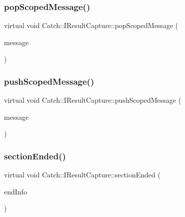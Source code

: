\subsubsection{\texorpdfstring{pop\+Scoped\+Message()}{popScopedMessage()}}
{\footnotesize\ttfamily virtual void Catch\+::\+I\+Result\+Capture\+::pop\+Scoped\+Message (\begin{DoxyParamCaption}\item[{\mbox{\hyperlink{struct_catch_1_1_message_info}{Message\+Info}} const \&}]{message }\end{DoxyParamCaption})\hspace{0.3cm}{\ttfamily [pure virtual]}}

\mbox{\label{struct_catch_1_1_i_result_capture_a91d154c1e087e383dcde5aad95cb6a05}} 
\subsubsection{\texorpdfstring{push\+Scoped\+Message()}{pushScopedMessage()}}
{\footnotesize\ttfamily virtual void Catch\+::\+I\+Result\+Capture\+::push\+Scoped\+Message (\begin{DoxyParamCaption}\item[{\mbox{\hyperlink{struct_catch_1_1_message_info}{Message\+Info}} const \&}]{message }\end{DoxyParamCaption})\hspace{0.3cm}{\ttfamily [pure virtual]}}

\mbox{\label{struct_catch_1_1_i_result_capture_a4e152bc43dc0933684e31fa67a58195d}} 
\subsubsection{\texorpdfstring{section\+Ended()}{sectionEnded()}}
{\footnotesize\ttfamily virtual void Catch\+::\+I\+Result\+Capture\+::section\+Ended (\begin{DoxyParamCaption}\item[{\mbox{\hyperlink{struct_catch_1_1_section_end_info}{Section\+End\+Info}} const \&}]{end\+Info }\end{DoxyParamCaption})\hspace{0.3cm}{\ttfamily [pure virtual]}}

